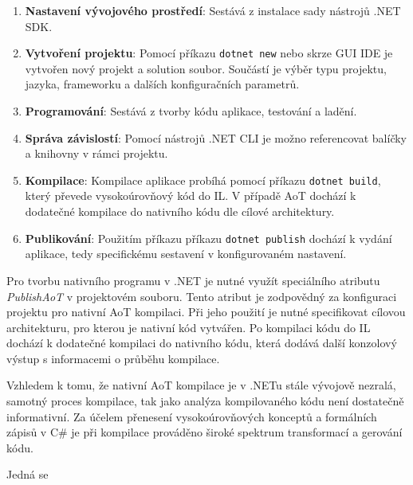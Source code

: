 \begin{enumerate}
    \item \textbf{Nastavení vývojového prostředí}: Sestává z instalace sady nástrojů .NET SDK.
    
    \item \textbf{Vytvoření projektu}: Pomocí příkazu \texttt{dotnet new} nebo skrze GUI IDE je vytvořen nový projekt a solution soubor. Součástí je výběr typu projektu, jazyka, frameworku a dalších konfiguračních parametrů.
    
    \item \textbf{Programování}: Sestává z tvorby kódu aplikace, testování a ladění.

    \item \textbf{Správa závislostí}: Pomocí nástrojů .NET CLI je možno referencovat balíčky a knihovny v rámci projektu.
    
    \item \textbf{Kompilace}: Kompilace aplikace probíhá pomocí příkazu \texttt{dotnet build}, který převede vysokoúrovňový kód do IL. V případě AoT dochází k dodatečné kompilace do nativního kódu dle cílové architektury.
    
    \item \textbf{Publikování}: Použitím příkazu příkazu \texttt{dotnet publish} dochází k vydání aplikace, tedy specifickému sestavení v konfigurovaném nastavení.
\end{enumerate}


Pro tvorbu nativního programu v .NET je nutné využít speciálního atributu \emph{PublishAoT} v projektovém souboru. Tento atribut je zodpovědný za konfiguraci projektu pro nativní AoT kompilaci. Při jeho použití je nutné specifikovat cílovou architekturu, pro kterou je nativní kód vytvářen. Po kompilaci kódu do IL dochází k dodatečné kompilaci do nativního kódu, která dodává další konzolový výstup s informacemi o průběhu kompilace.

Vzhledem k tomu, že nativní AoT kompilace je v .NETu stále vývojově nezralá, samotný proces kompilace, tak jako analýza kompilovaného kódu není dostatečně informativní. Za účelem přenesení vysokoúrovňových konceptů a formálních zápisů v C\# je při kompilace prováděno široké spektrum transformací a gerování kódu.


Jedná se





